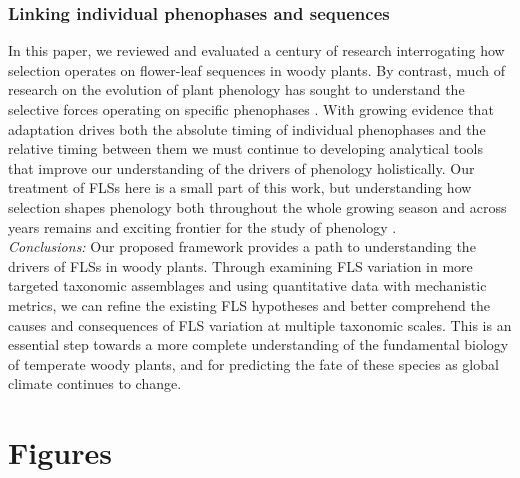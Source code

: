 \documentclass{article}
\begin{document}
\subsubsection*{Linking individual phenophases and sequences} %
\noindent In this paper, we reviewed and evaluated a century of research interrogating how selection operates on flower-leaf sequences in woody plants. By contrast, much of research on the evolution of plant phenology has sought to understand the selective forces operating on specific phenophases  \citep[e.g.][]{Savage2013,OLLERTON_1992} . With growing evidence that adaptation drives both the absolute timing of individual phenophases and the relative timing between them we must continue to developing analytical tools that improve our understanding of the drivers of phenology holistically. %
Our treatment of FLSs here is a small part of this work, but understanding how selection shapes phenology both throughout the whole growing season and across years remains and exciting frontier for the study of phenology \citep{Wolkovich2014b}. \\

\noindent \emph{Conclusions:} Our proposed framework provides a path to understanding the drivers of FLSs in woody plants. Through examining FLS variation in more targeted taxonomic assemblages and using quantitative data with mechanistic metrics, we can refine the existing FLS hypotheses and better comprehend the causes and consequences of FLS variation at multiple taxonomic scales. This is an essential step towards a more complete understanding of the fundamental biology of temperate woody plants, and for predicting the fate of these species as global climate continues to change.




\section*{Figures}
\end{document}
